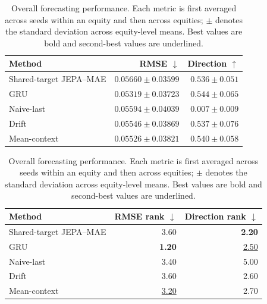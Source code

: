 \begin{table}[t]
\centering
\small
\caption{Overall forecasting performance. Each metric is first averaged across seeds within an equity and then across equities; $\pm$ denotes the standard deviation across equity-level means. Best values are bold and second-best values are underlined.}
\label{tab:main_metrics}
\begin{tabular}{lrr}
\toprule
Method & RMSE $\downarrow$ & Direction $\uparrow$ \\
\midrule
Shared-target JEPA--MAE & $0.05660 \pm 0.03599$ & $0.536 \pm 0.051$ \\
GRU & \textbf{$0.05319 \pm 0.03723$} & \textbf{$0.544 \pm 0.065$} \\
Naive-last & $0.05594 \pm 0.04039$ & $0.007 \pm 0.009$ \\
Drift & $0.05546 \pm 0.03869$ & $0.537 \pm 0.076$ \\
Mean-context & \underline{$0.05526 \pm 0.03821$} & \underline{$0.540 \pm 0.058$} \\
\bottomrule
\end{tabular}
\par\medskip
\begin{tabular}{lrr}
\toprule
Method & RMSE rank $\downarrow$ & Direction rank $\downarrow$ \\
\midrule
Shared-target JEPA--MAE & 3.60 & \textbf{2.20} \\
GRU & \textbf{1.20} & \underline{2.50} \\
Naive-last & 3.40 & 5.00 \\
Drift & 3.60 & 2.60 \\
Mean-context & \underline{3.20} & 2.70 \\
\bottomrule
\end{tabular}
\end{table}
